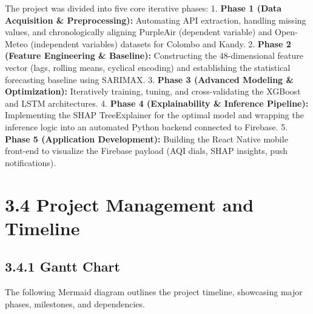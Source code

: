 The project was divided into five core iterative phases: 1.
\textbf{Phase 1 (Data Acquisition \& Preprocessing):} Automating API
extraction, handling missing values, and chronologically aligning
PurpleAir (dependent variable) and Open-Meteo (independent variables)
datasets for Colombo and Kandy. 2. \textbf{Phase 2 (Feature Engineering
\& Baseline):} Constructing the 48-dimensional feature vector (lags,
rolling means, cyclical encoding) and establishing the statistical
forecasting baseline using SARIMAX. 3. \textbf{Phase 3 (Advanced
Modeling \& Optimization):} Iteratively training, tuning, and
cross-validating the XGBoost and LSTM architectures. 4. \textbf{Phase 4
(Explainability \& Inference Pipeline):} Implementing the SHAP
TreeExplainer for the optimal model and wrapping the inference logic
into an automated Python backend connected to Firebase. 5. \textbf{Phase
5 (Application Development):} Building the React Native mobile front-end
to visualize the Firebase payload (AQI dials, SHAP insights, push
notifications).

\section{3.4 Project Management and
Timeline}\label{project-management-and-timeline}

\subsection{3.4.1 Gantt Chart}\label{gantt-chart}

The following Mermaid diagram outlines the project timeline, showcasing
major phases, milestones, and dependencies.

